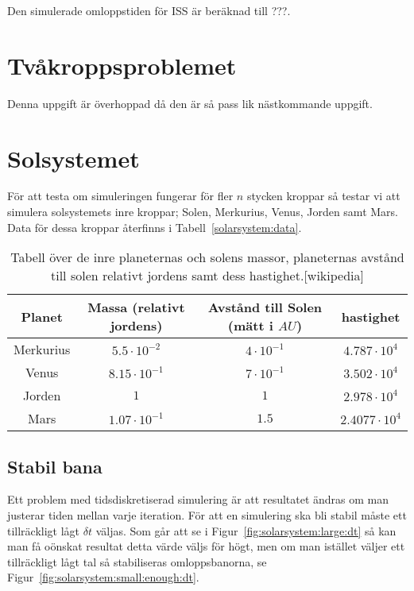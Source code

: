 \documentclass[a4]{article}
\begin{document}
Den simulerade omloppstiden för ISS är beräknad till ???.

\section{Tvåkroppsproblemet}
Denna uppgift är överhoppad då den är så pass lik nästkommande uppgift.

\section{Solsystemet}
För att testa om simuleringen fungerar för fler $n$ stycken kroppar så testar
vi att simulera solsystemets inre kroppar; Solen, Merkurius, Venus, Jorden samt
Mars.
Data för dessa kroppar återfinns i Tabell~\vref{solarsystem:data}.

\begin{table}
\begin{center}
\begin{tabular}{c|c|c|c}
	Planet    & Massa (relativt jordens) & Avstånd till Solen (mätt i $AU$) & hastighet\\
	\hline
	Merkurius & $5.5 \cdot 10^{-2}$  & $4 \cdot 10^{-1}$  &  $4.787 \cdot 10^4$ \\
	Venus     & $8.15 \cdot 10^{-1}$ & $7 \cdot 10^{-1}$  &  $3.502 \cdot 10^4$ \\ 
	Jorden    & $1$                  & $1$                &  $2.978 \cdot 10^4$ \\
	Mars      & $1.07 \cdot 10^{-1}$ & $1.5$              &  $2.4077 \cdot 10^4$
\end{tabular}
\caption{
	Tabell över de inre planeternas och solens massor, planeternas avstånd till
	solen relativt jordens samt dess hastighet.[wikipedia]
}
\label{solarsystem:data}
\end{center}
\end{table}
	

		\subsection{Stabil bana}
Ett problem med tidsdiskretiserad simulering är att resultatet ändras om man
justerar tiden mellan varje iteration.
För att en simulering ska bli stabil måste ett tillräckligt lågt $\delta t$
väljas.
Som går att se i Figur~\vref{fig:solarsystem:large:dt} så kan man få oönskat
resultat detta värde väljs för högt, men om man istället väljer ett
tillräckligt lågt tal så stabiliseras omloppsbanorna, se
Figur~\vref{fig:solarsystem:small:enough:dt}.
\end{document}
